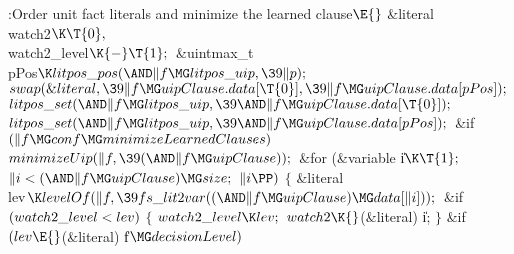 \Y\B\4:Order unit fact literals and minimize the learned clause\X${}\E{}$\6
\&{literal} \\{watch2}${}\K\T{0},{}$ \\{watch2\_level}${}\K{-}\T{1};{}$\6
\&{uintmax\_t} \\{pPos}${}\K\\{litpos\_pos}({\AND}\|f\MG\\{litpos\_uip},\39%
\|p);{}$\7
${}\\{swap}(\&{literal},\39\|f\MG\\{uipClause}.\\{data}[\T{0}],\39\|f\MG%
\\{uipClause}.\\{data}[\\{pPos}]);{}$\6
${}\\{litpos\_set}({\AND}\|f\MG\\{litpos\_uip},\39{\AND}\|f\MG\\{uipClause}.%
\\{data}[\T{0}]);{}$\6
${}\\{litpos\_set}({\AND}\|f\MG\\{litpos\_uip},\39{\AND}\|f\MG\\{uipClause}.%
\\{data}[\\{pPos}]);{}$\6
\&{if} ${}(\|f\MG\\{conf}\MG\\{minimizeLearnedClauses}){}$\1\5
${}\\{minimizeUip}(\|f,\39({\AND}\|f\MG\\{uipClause}));{}$\2\6
\&{for} (\&{variable} \|i${}\K\T{1};{}$ ${}\|i<({\AND}\|f\MG\\{uipClause})\MG%
\\{size};{}$ ${}\|i\PP){}$\5
${}\{{}$\1\6
\&{literal} \\{lev}${}\K\\{levelOf}(\|f,\39\\{fs\_lit2var}(({\AND}\|f\MG%
\\{uipClause})\MG\\{data}[\|i]));{}$\7
\&{if} ${}(\\{watch2\_level}<\\{lev}){}$\5
${}\{{}$\1\6
${}\\{watch2\_level}\K\\{lev};{}$\6
${}\\{watch2}\K{}$(\&{literal}) \|i;\6
\4${}\}{}$\2\6
\&{if} ${}(\\{lev}\E{}$(\&{literal}) \|f${}\MG\\{decisionLevel}){}$\1\5
